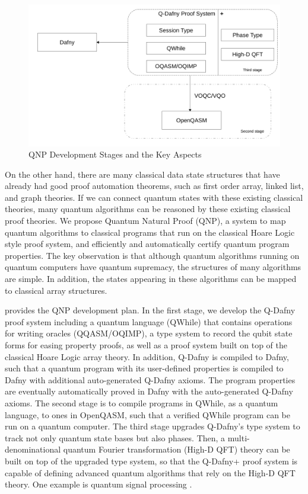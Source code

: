 \begin{figure}[t]
  \includegraphics[width=.75\textwidth]{stage}
  \caption{QNP Development Stages and the Key Aspects}
\label{fig:arch}
\end{figure}

On the other hand, there are many classical data state structures that have already had good proof automation theorems,
such as first order array, linked list, and graph theories. 
If we can connect quantum states with these existing classical theories, 
many quantum algorithms can be reasoned by these existing classical proof theories. 
We propose Quantum Natural Proof (QNP), a system to map quantum algorithms 
to classical programs that run on the classical Hoare Logic style proof system, 
and efficiently and automatically certify quantum program properties.
The key observation is that although quantum algorithms running on quantum computers have quantum supremacy,
the structures of many algorithms are simple. 
In addition, the states appearing in these algorithms can be mapped to classical array structures.

 provides the QNP development plan. 
In the first stage, we develop the Q-Dafny proof system including a quantum language (QWhile) 
that contains operations for writing oracles (QQASM/OQIMP),
a type system to record the qubit state forms for easing property proofs, 
as well as a proof system built on top of the classical Hoare Logic array theory.
In addition, Q-Dafny is compiled to Dafny, 
such that a quantum program with its user-defined properties is compiled to Dafny with additional auto-generated Q-Dafny axioms.
The program properties are eventually automatically proved in Dafny with the auto-generated Q-Dafny axioms.
The second stage is to compile programs in QWhile, as a quantum language, to ones in OpenQASM,
such that a verified QWhile program can be run on a quantum computer. 
The third stage upgrades Q-Dafny's type system to track not only quantum state bases but also phases.
Then, a multi-denominational quantum Fourier transformation (High-D QFT) theory can be built on top of the upgraded type system,
so that the Q-Dafny+ proof system is capable of defining advanced quantum algorithms that rely on the High-D QFT theory.
One example is quantum signal processing \cite{Low_2017}.

